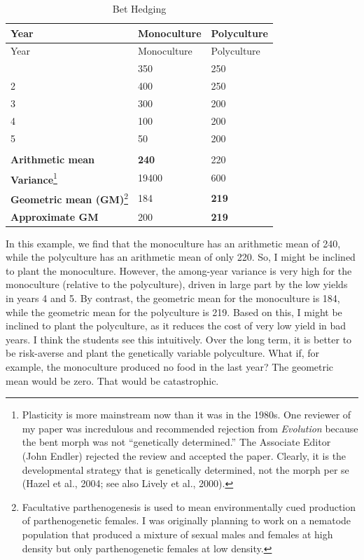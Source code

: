 \documentclass[
  letterpaper,
]{book}
\begin{document}
\hypertarget{tbl-bh}{}
\begin{longtable}[]{@{}lll@{}}
\caption{\label{tbl-bh}Bet Hedging}\tabularnewline
\toprule\noalign{}
Year & Monoculture & Polyculture \\
\midrule\noalign{}
\endfirsthead
\toprule\noalign{}
Year & Monoculture & Polyculture \\
\midrule\noalign{}
\endhead
\bottomrule\noalign{}
\endlastfoot
1 & 350 & 250 \\
2 & 400 & 250 \\
3 & 300 & 200 \\
4 & 100 & 200 \\
5 & 50 & 200 \\
& & \\
\textbf{Arithmetic mean} & \textbf{240} & 220 \\
\textbf{Variance}\footnote{Plasticity is more mainstream now than it was
  in the 1980s. One reviewer of my paper was incredulous and recommended
  rejection from \emph{Evolution} because the bent morph was not
  ``genetically determined.'' The Associate Editor (John Endler)
  rejected the review and accepted the paper. Clearly, it is the
  developmental strategy that is genetically determined, not the morph
  per se (Hazel et al., 2004; see also Lively et al., 2000).} & 19400 &
600 \\
\textbf{Geometric mean (GM)}\footnote{Facultative parthenogenesis is
  used to mean environmentally cued production of parthenogenetic
  females. I was originally planning to work on a nematode population
  that produced a mixture of sexual males and females at high density
  but only parthenogenetic females at low density.} & 184 &
\textbf{219} \\
\textbf{Approximate GM} & 200 & \textbf{219} \\
\end{longtable}

In this example, we find that the monoculture has an arithmetic mean of
240, while the polyculture has an arithmetic mean of only 220. So, I
might be inclined to plant the monoculture. However, the among-year
variance is very high for the monoculture (relative to the polyculture),
driven in large part by the low yields in years 4 and 5. By contrast,
the geometric mean for the monoculture is 184, while the geometric mean
for the polyculture is 219. Based on this, I might be inclined to plant
the polyculture, as it reduces the cost of very low yield in bad years.
I think the students see this intuitively. Over the long term, it is
better to be risk-averse and plant the genetically variable polyculture.
What if, for example, the monoculture produced no food in the last year?
The geometric mean would be zero. That would be catastrophic.
\end{document}
